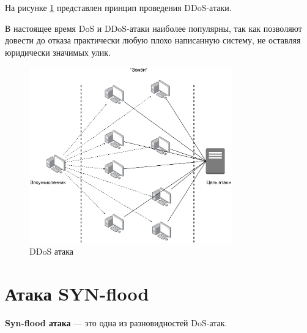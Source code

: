 \documentclass{bmstu}
\begin{document}
На рисунке \ref{img:ddos} представлен принцип проведения DDoS-атаки.

В настоящее время DoS и DDoS-атаки наиболее популярны, так как позволяют довести до отказа практически любую плохо написанную систему, не оставляя юридически значимых улик.

\begin{figure}[hbtp]
 \centering
 \includegraphics[width=0.78\textwidth]{inc/img/ddos.pdf}
 \caption{DDoS атака}
 \label{img:ddos}
\end{figure}




\section{Атака SYN-flood}

\textbf{Syn-flood атака} --- это одна из разновидностей DoS-атак. 
\end{document}
